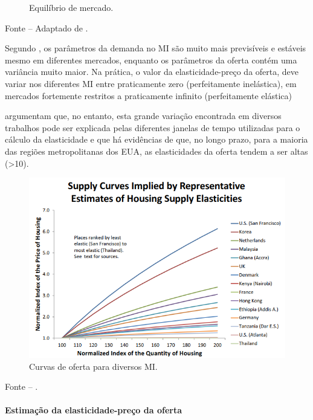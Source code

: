 \documentclass[
	12pt,				%
	oneside,			%
	a4paper,			%
	chapter=TITLE,		%
	section=TITLE,		%
	english,			%
	brazil				%
	]{abntex2}
\newcommand{\bcenter}{\begin{center}}
\newcommand{\ecenter}{\end{center}}
\begin{document}
\begin{refsection}
\begin{figure}[H]
{}

\caption{Equilíbrio de mercado.}\label{fig:casosEspeciais}
\end{figure}
\bcenter

\small Fonte -- Adaptado de \textcite[p.~312]{varian}.
\ecenter

Segundo \textcite[p.~17]{Malpezzi2002TheRO}, os parâmetros da demanda no \gls{MI} são
muito mais previsíveis e estáveis mesmo em diferentes mercados, enquanto os
parâmetros da oferta contém uma variância muito maior. Na prática, o valor da
elasticidade-preço da oferta, deve variar nos diferentes \gls{MI} entre
praticamente zero (perfeitamente inelástica), em mercados fortemente restritos
\autocite{malaysia} a praticamente infinito (perfeitamente elástica)

\textcite{supplyelasticity} argumentam que, no entanto, esta
grande variação encontrada em diversos trabalhos pode ser explicada pelas
diferentes janelas de tempo utilizadas para o cálculo da elasticidade e que há
evidências de que, no longo prazo, para a maioria das regiões metropolitanas dos
\gls{EUA}, as elasticidades da oferta tendem a ser altas (\textgreater{}10).
\begin{figure}[H]

{\centering \includegraphics[width=0.7\linewidth]{images/supplyCurves} 

}

\caption{Curvas de oferta para diversos \gls{MI}.}\label{fig:supplyCurves}
\end{figure}
\bcenter

\small Fonte -- \textcite[p.~19]{regulation}.
\ecenter

\hypertarget{estimauxe7uxe3o-da-elasticidade-preuxe7o-da-oferta}{%
\paragraph{Estimação da elasticidade-preço da oferta}\label{estimauxe7uxe3o-da-elasticidade-preuxe7o-da-oferta}}


\end{refsection}
\end{document}
